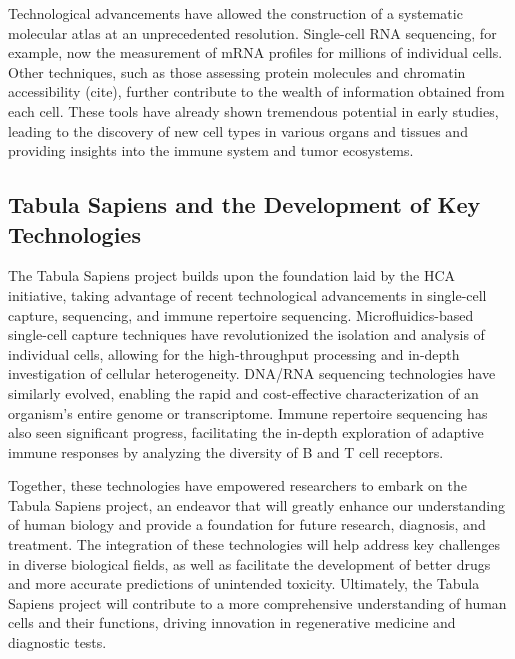 Technological advancements have allowed the construction of a systematic molecular atlas at an unprecedented resolution. Single-cell RNA sequencing, for example, now the measurement of  mRNA profiles for millions of individual cells\cite{svensson2017power}. Other techniques, such as those assessing protein molecules\cite{stoeckius2017simultaneous} and chromatin accessibility (cite), further contribute to the wealth of information obtained from each cell. These tools have already shown tremendous potential in early studies, leading to the discovery of new cell types in various organs and tissues and providing insights into the immune system and tumor ecosystems\cite{regev2017human}.

\subsection{Tabula Sapiens and the Development of Key Technologies}

The Tabula Sapiens project builds upon the foundation laid by the HCA initiative, taking advantage of recent technological advancements in single-cell capture, sequencing, and immune repertoire sequencing. Microfluidics-based single-cell capture techniques have revolutionized the isolation and analysis of individual cells, allowing for the high-throughput processing and in-depth investigation of cellular heterogeneity\cite{macosko2015highly}. DNA/RNA sequencing technologies have similarly evolved, enabling the rapid and cost-effective characterization of an organism's entire genome or transcriptome\cite{goodwin2016coming}. Immune repertoire sequencing has also seen significant progress, facilitating the in-depth exploration of adaptive immune responses by analyzing the diversity of B and T cell receptors\cite{georgiou_promise_2014}.

Together, these technologies have empowered researchers to embark on the Tabula Sapiens project, an endeavor that will greatly enhance our understanding of human biology and provide a foundation for future research, diagnosis, and treatment. The integration of these technologies will help address key challenges in diverse biological fields, as well as facilitate the development of better drugs and more accurate predictions of unintended toxicity. Ultimately, the Tabula Sapiens project will contribute to a more comprehensive understanding of human cells and their functions, driving innovation in regenerative medicine and diagnostic tests.

